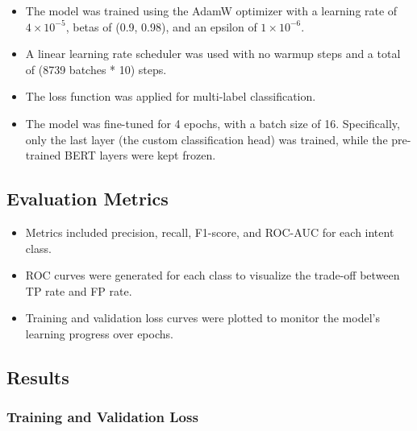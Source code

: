         \begin{itemize}
        
            \item The model was trained using the AdamW optimizer with a learning rate of $4 \times 10^{-5}$, betas of (0.9, 0.98), and an epsilon of $1 \times 10^{-6}$.

            \item A linear learning rate scheduler was used with no warmup steps and a total of (8739 batches * 10) steps.

            \item The  loss function was applied for multi-label classification.

            \item The model was fine-tuned for 4 epochs, with a batch size of 16. Specifically, only the last layer (the custom classification head) was trained, while the pre-trained BERT layers were kept frozen. 
            
        \end{itemize}

        \subsection{Evaluation Metrics}

        \begin{itemize}
        
            \item Metrics included precision, recall, F1-score, and ROC-AUC for each intent class.

            \item ROC curves were generated for each class to visualize the trade-off between TP rate and FP rate.

            \item Training and validation loss curves were plotted to monitor the model's learning progress over epochs.
            
        \end{itemize}
        

    \subsection{Results}

        \subsubsection{Training and Validation Loss \\}

